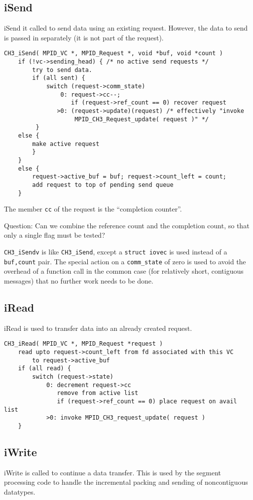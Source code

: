 \documentclass{article}
\def\code{\begingroup\makeustext\eatcode}
\def\eatcode#1{\texttt{#1}\endgroup}
\begin{document}
\subsection{iSend}
iSend it called to send data using an existing request.  However, the data to
send is passed in separately (it is not part of the request).
\begin{verbatim}
CH3_iSend( MPID_VC *, MPID_Request *, void *buf, void *count )
    if (!vc->sending_head) { /* no active send requests */
        try to send data.
        if (all sent) {
            switch (request->comm_state)
                0: request->cc--; 
                   if (request->ref_count == 0) recover request
               >0: (request->update)(request) /* effectively "invoke 
                    MPID_CH3_Request_update( request )" */
         }
    else {
        make active request
        }
    }
    else {
        request->active_buf = buf; request->count_left = count;
        add request to top of pending send queue
    }
\end{verbatim}
The member \code{cc} of the request is the ``completion counter''.

Question: Can we combine the reference count and the completion count,
so that only a single flag must be tested?

\code{CH3_iSendv} is like \code{CH3_iSend}, except a \code{struct iovec} is
used instead of a \code{buf,count} pair.  The special action on a
\code{comm_state} of zero is used to avoid the overhead of a function
call in the common case (for relatively short, contiguous messages)
that no further work needs to be done.

\subsection{iRead}
iRead is used to transfer data into an already created request.  

\begin{verbatim}
CH3_iRead( MPID_VC *, MPID_Request *request )
    read upto request->count_left from fd associated with this VC
        to request->active_buf
    if (all read) {
        switch (request->state) 
            0: decrement request->cc
               remove from active list
               if (request->ref_count == 0) place request on avail list
            >0: invoke MPID_CH3_request_update( request )
    }
\end{verbatim}

\subsection{iWrite}
iWrite is called to continue a data transfer.  This is used by the
segment processing code to handle the incremental packing and sending
of noncontiguous datatypes.
\end{document}
